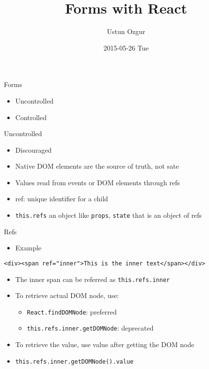 \documentclass[presentation]{beamer}
\author{Ustun Ozgur}
\date{2015-05-26 Tue}
\title{Forms with React}
\begin{document}
\maketitle

\begin{frame}[label=sec-1]{Forms}
\begin{itemize}
\item Uncontrolled
\item Controlled
\end{itemize}
\end{frame}

\begin{frame}[fragile,label=sec-2]{Uncontrolled}
 \begin{itemize}
\item Discouraged
\item Native DOM elements are the source of truth, not sate
\item Values read from events or DOM elements through refs
\item ref: unique identifier for a child
\item \texttt{this.refs} an object like \texttt{props}, \texttt{state} that is an object of refs
\end{itemize}
\end{frame}

\begin{frame}[fragile,label=sec-3]{Refs}
 \begin{itemize}
\item Example
\end{itemize}
\begin{verbatim}
<div><span ref="inner">This is the inner text</span></div>
\end{verbatim}

\begin{itemize}
\item The inner span can  be referred as \texttt{this.refs.inner}

\item To retrieve actual DOM node, use:
\begin{itemize}
\item \texttt{React.findDOMNode}: preferred
\item \texttt{this.refs.inner.getDOMNode}: deprecated
\end{itemize}

\item To retrieve the value, use value after getting the DOM node
\item \texttt{this.refs.inner.getDOMNode().value}
\end{itemize}
\end{frame}
\end{document}
